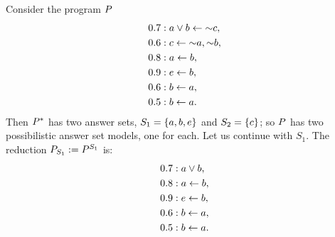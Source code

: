 \begin{example}
    \label{ex:example7}
    Consider the program $\pflp$
    \begin{align*}
        0.7 & : a\flpor b \lpif \flpnot c,   \\
        0.6 & : c \lpif \flpnot a,\flpnot b, \\
        0.8 & : a\lpif b,                    \\
        0.9 & : e\lpif b,                    \\
        0.6 & : b\lpif a,                    \\
        0.5 & : b\lpif a.
    \end{align*}
    Then $\proj[\pflp]$ has two answer sets, $S_1=\set{a,b,e}$ and $S_2=\set{c}$; so $\pflp$ has two possibilistic answer set models, one for each. Let us continue with $S_1$.
    The reduction $\pflp_{S_1}\eqdef\pred{\pflp}{S_1}$ is:
    \begin{align*}
        0.7 & : a\flpor b, \\
        0.8 & : a\lpif b,  \\
        0.9 & : e\lpif b,  \\
        0.6 & : b\lpif a,  \\
        0.5 & : b\lpif a.
    \end{align*}
\end{example}
